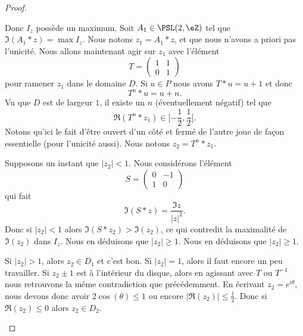 \begin{proof}
\begin{subproof}
            Donc \( I_z\) possède un maximum. Soit \( A_1\in\PSL(2,\eZ)\) tel que \( \Im(A_1*z)=\max I_z\). Nous notons \( z_1=A_1*z\), et que nous n'avons a priori pas l'unicité. Nous allons maintenant agir sur \( z_1\) avec l'élément
            \begin{equation}
                T=\begin{pmatrix}
                    1    &   1    \\ 
                    0    &   1    
                \end{pmatrix}
            \end{equation}
            pour ramener \( z_1\) dans le domaine \( D\). Si \( u\in P\) nous avons \( T*u=u+1\) et donc
            \begin{equation}
                T^n*u=u+n.
            \end{equation}
            Vu que \( D\) est de largeur \( 1\), il existe un \( n\) (éventuellement négatif) tel que 
            \begin{equation}
                \Re(T^n*z_1)\in\mathopen[ -\frac{ 1 }{2} , \frac{ 1 }{2} [.
            \end{equation}
            Notons qu'ici le fait d'être ouvert d'un côté et fermé de l'autre joue de façon essentielle (pour l'unicité aussi). Nous notons \( z_2=T^n*z_1\).
            
            Supposons un instant que \( | z_2 |<1\). Nous considérons l'élément
            \begin{equation}
                S=\begin{pmatrix}
                    0    &   -1    \\ 
                    1    &   0    
                \end{pmatrix}
            \end{equation}
            qui fait
            \begin{equation}
                \Im(S*z)=\frac{ \Im z }{| z |^2}.
            \end{equation}
            Donc si \( | z_2 |<1\) alors \( \Im(S*z_2)>\Im(z_2)\), ce qui contredit la maximalité de \( \Im(z_2)\) dans \( I_z\). Nous en déduisons que \( | z_2 |\geq 1\). Nous en déduisons que \( | z_2 |\geq 1\).

            Si \( | z_2 |>1\), alors \( z_2\in D_1\) et c'est bon. Si \( | z_2 |=1\), alors il faut encore un peu travailler. Si \( z_2\pm 1\) est à l'intérieur du disque, alors en agissant avec \( T\) ou \( T^{-1}\) nous retrouvons la même contradiction que précédemment. En écrivant \( z_2= e^{i\theta}\), nous devons donc avoir \( 2\cos(\theta)\leq 1\) ou encore \( |\Re(z_2)|\leq \frac{ 1 }{2}\). Donc si \( \Re(z_2)\leq 0\) alors \( z_2\in D_2\).


\end{subproof}
\end{proof}
